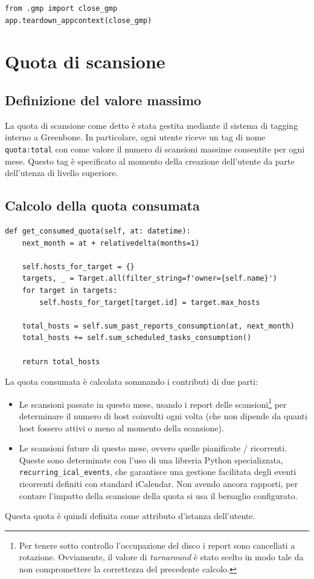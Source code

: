 \begin{lstlisting}[caption={Aggancio per chiudere le connessioni}]
from .gmp import close_gmp
app.teardown_appcontext(close_gmp)
\end{lstlisting}

\section{Quota di scansione}
\subsection{Definizione del valore massimo}
La quota di scansione come detto è stata gestita mediante il sistema di tagging interno a Greenbone. In particolare, ogni utente riceve un tag di nome \texttt{quota:total} con come valore il numero di scansioni massime consentite per ogni mese. Questo tag è specificato al momento della creazione dell'utente da parte dell'utenza di livello superiore.

\subsection{Calcolo della quota consumata}

\begin{lstlisting}[caption={Calcolo della quota consumata (ad alto livello)}]
def get_consumed_quota(self, at: datetime):
    next_month = at + relativedelta(months=1)

    self.hosts_for_target = {}
    targets, _ = Target.all(filter_string=f'owner={self.name}')
    for target in targets:
        self.hosts_for_target[target.id] = target.max_hosts

    total_hosts = self.sum_past_reports_consumption(at, next_month)
    total_hosts += self.sum_scheduled_tasks_consumption()

    return total_hosts
\end{lstlisting}

La quota consumata è calcolata sommando i contributi di due parti:
\begin{itemize}
    \item Le scansioni passate in questo mese, usando i report delle scansioni\footnote{Per tenere sotto controllo l'occupazione del disco i report sono cancellati a rotazione. Ovviamente, il valore di \emph{turnaround} è stato scelto in modo tale da non compromettere la correttezza del precedente calcolo.} per determinare il numero di host coinvolti ogni volta (che non dipende da quanti host fossero attivi o meno al momento della scansione).
    \item Le scansioni future di questo mese, ovvero quelle pianificate / ricorrenti. Queste sono determinate con l'uso di una libreria Python specializzata, \texttt{recurring\_ical\_events}, che garantisce una gestione facilitata degli eventi ricorrenti definiti con standard iCalendar. Non avendo ancora rapporti, per contare l'impatto della scansione della quota si usa il bersaglio configurato.
\end{itemize}
Questa quota è quindi definita come attributo d'istanza dell'utente.

